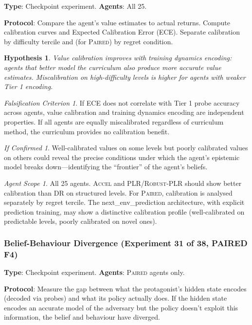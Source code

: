 \documentclass[11pt,a4paper]{article}
\newtheorem{hypothesis}{Hypothesis}[subsection]
\theoremstyle{remark}
\newtheorem*{falsification}{Falsification Criterion}
\newtheorem*{implication}{If Confirmed}
\newtheorem*{agentscope}{Agent Scope}
\newcommand{\paired}{\textsc{Paired}}
\newcommand{\accel}{\textsc{Accel}}
\newcommand{\plr}{\textsc{PLR}}
\newcommand{\dr}{\textsc{DR}}
\newcommand{\rplr}{\textsc{Robust-PLR}}
\begin{document}
\textbf{Type}: Checkpoint experiment. \textbf{Agents}: All 25.

\textbf{Protocol}: Compare the agent's value estimates to actual returns. Compute calibration curves and Expected Calibration Error (ECE). Separate calibration by difficulty tercile and (for \paired{}) by regret condition.

\begin{hypothesis}
Value calibration improves with training dynamics encoding: agents that better model the curriculum also produce more accurate value estimates. Miscalibration on high-difficulty levels is higher for agents with weaker Tier 1 encoding.
\end{hypothesis}

\begin{falsification}
If ECE does not correlate with Tier 1 probe accuracy across agents, value calibration and training dynamics encoding are independent properties. If all agents are equally miscalibrated regardless of curriculum method, the curriculum provides no calibration benefit.
\end{falsification}

\begin{implication}
Well-calibrated values on some levels but poorly calibrated values on others could reveal the precise conditions under which the agent's epistemic model breaks down---identifying the ``frontier'' of the agent's beliefs.
\end{implication}

\begin{agentscope}
All 25 agents. \accel{} and \plr{}/\rplr{} should show better calibration than \dr{} on structured levels. For \paired{}, calibration is analysed separately by regret tercile. The next\_env\_prediction architecture, with explicit prediction training, may show a distinctive calibration profile (well-calibrated on predictable levels, poorly calibrated on novel ones).
\end{agentscope}

\subsubsection{Belief-Behaviour Divergence (Experiment 31 of 38, PAIRED F4)}
\label{exp:belief_behaviour_divergence}

\textbf{Type}: Checkpoint experiment. \textbf{Agents}: \paired{} agents only.

\textbf{Protocol}: Measure the gap between what the protagonist's hidden state encodes (decoded via probes) and what its policy actually does. If the hidden state encodes an accurate model of the adversary but the policy doesn't exploit this information, the belief and behaviour have diverged.
\end{document}
